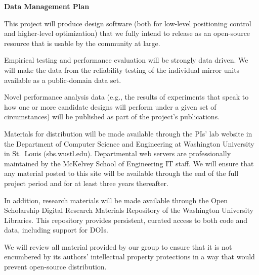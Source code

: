 \documentclass[12pt]{article}
\begin{document}
\pagestyle{empty}
\thispagestyle{empty}

\begin{center}
\textbf{\Large Data Management Plan}
\end{center}

This project will produce design software (both for low-level positioning
control and higher-level optimization)
that we fully intend to release as an open-source resource that
is usable by the community at large.

Empirical testing and performance evaluation will be strongly data
driven.  We will make the data from the reliability testing of the
individual mirror units available as a public-domain data set.

Novel performance analysis data (e.g., the results of experiments
that speak to how one or more candidate designs will perform under
a given set of circumstances) will be published as part of the
project's publications.

Materials for distribution will be made available through the PIs' lab
website in the Department of Computer Science and Engineering at
Washington University in St.\ Louis (sbs.wustl.edu).
Departmental web servers
are professionally maintained by the McKelvey School of Engineering
IT staff.
We will ensure that any material posted to this site will be available
through the end of the full project period and for at least three
years thereafter.

In addition, research materials will be made available through the
Open Scholarship Digital Research Materials Repository of the 
Washington University Libraries.  This repository provides persistent,
curated access to both code and data, including support for DOIs.

We will review all material provided by our group to ensure that it is
not encumbered by its authors' intellectual property protections in a
way that would prevent open-source distribution.
\end{document}
